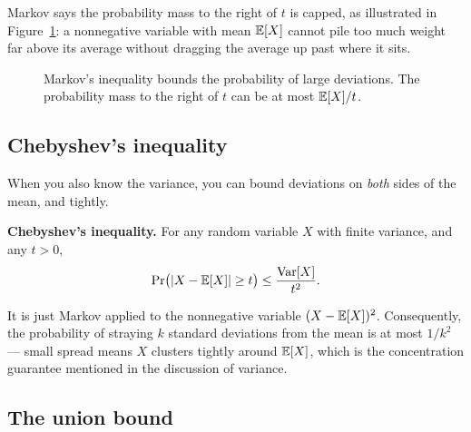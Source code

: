 Markov says the probability mass to the right of $t$ is capped, as illustrated in Figure~\ref{fig:markov}: a nonnegative variable
with mean $\mathbb{E}[X]$ cannot pile too much weight far above its average without dragging
the average up past where it sits.

\begin{figure}[htbp]
\centering
{}
\caption{Markov's inequality bounds the probability of large deviations. The probability mass to the right of $t$ can be at most $\mathbb{E}[X]/t$.}
\label{fig:markov}
\end{figure}

\subsection{Chebyshev's inequality}

When you also know the variance, you can bound deviations on \emph{both} sides of the
mean, and tightly.

\begin{formalbox}
\textbf{Chebyshev's inequality.} For any random variable $X$ with finite variance, and
any $t > 0$,
\[
\Pr\!\big(\lvert X - \mathbb{E}[X]\rvert \ge t\big) \le \frac{\operatorname{Var}[X]}{t^2}.
\]
\end{formalbox}

It is just Markov applied to the nonnegative variable $(X - \mathbb{E}[X])^2$. Consequently, the
probability of straying $k$ standard deviations from the mean is at most $1/k^2$ ---
small spread means $X$ clusters tightly around $\mathbb{E}[X]$, which is the concentration
guarantee mentioned in the discussion of variance.

\subsection{The union bound}

